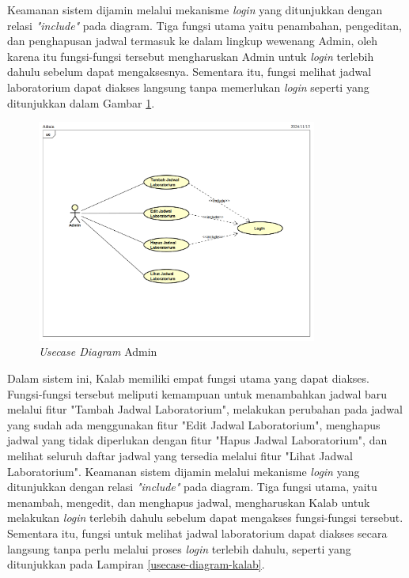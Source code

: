 Keamanan sistem dijamin melalui mekanisme \textit{login} yang ditunjukkan dengan relasi \textit{"include"} pada diagram. Tiga fungsi utama yaitu penambahan, pengeditan, dan penghapusan jadwal termasuk ke dalam lingkup wewenang Admin, oleh karena itu fungsi-fungsi tersebut mengharuskan Admin untuk \textit{login} terlebih dahulu sebelum dapat mengaksesnya. Sementara itu, fungsi melihat jadwal laboratorium dapat diakses langsung tanpa memerlukan \textit{login} seperti yang ditunjukkan dalam Gambar \ref{usecase-diagram-admin}.

\begin{figure}
	\centering
	\includegraphics[width=0.82\textwidth]{konten/gambar/usecase-diagram/admin.png}
	\caption{\textit{Usecase Diagram} Admin}
	\label{usecase-diagram-admin}
\end{figure}

Dalam sistem ini, Kalab memiliki empat fungsi utama yang dapat diakses. Fungsi-fungsi tersebut meliputi kemampuan untuk menambahkan jadwal baru melalui fitur "Tambah Jadwal Laboratorium", melakukan perubahan pada jadwal yang sudah ada menggunakan fitur "Edit Jadwal Laboratorium", menghapus jadwal yang tidak diperlukan dengan fitur "Hapus Jadwal Laboratorium", dan melihat seluruh daftar jadwal yang tersedia melalui fitur "Lihat Jadwal Laboratorium". Keamanan sistem dijamin melalui mekanisme \textit{login} yang ditunjukkan dengan relasi \textit{"include"} pada diagram. Tiga fungsi utama, yaitu menambah, mengedit, dan menghapus jadwal, mengharuskan Kalab untuk melakukan \textit{login} terlebih dahulu sebelum dapat mengakses fungsi-fungsi tersebut. Sementara itu, fungsi untuk melihat jadwal laboratorium dapat diakses secara langsung tanpa perlu melalui proses \textit{login} terlebih dahulu, seperti yang ditunjukkan pada Lampiran \ref{usecase-diagram-kalab}.

